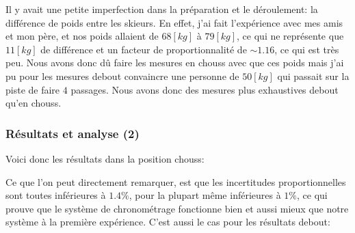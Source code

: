 \documentclass{article}
\begin{document}
Il y avait une petite imperfection dans la préparation et le déroulement: la différence de poids entre les skieurs. En effet, j'ai fait l'expérience avec mes amis et mon père, et nos poids allaient de $68[kg]$ à $79[kg]$, ce qui ne représente que $11[kg]$ de différence et un facteur de proportionnalité de $\sim 1.16$, ce qui est très peu. Nous avons donc dû faire les mesures en chouss avec que ces poids mais j'ai pu pour les mesures debout convaincre une personne de $50[kg]$ qui passait sur la piste de faire $4$ passages. Nous avons donc des mesures plus exhaustives debout qu'en chouss.

\subsubsection{Résultats et analyse (2)}

Voici donc les résultats dans la position chouss:

\begin{center}
\end{center}

\vspace{0.3cm}

Ce que l'on peut directement remarquer, est que les incertitudes proportionnelles sont toutes inférieures à $1.4 \%$, pour la plupart même inférieures à $1 \%$, ce qui prouve que le système de chronométrage fonctionne bien et aussi mieux que notre système à la première expérience. C'est aussi le cas pour les résultats debout:
\end{document}

